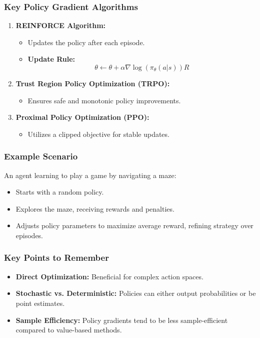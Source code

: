 \documentclass[aspectratio=169]{beamer}
\begin{document}
\begin{frame}[fragile]
    \frametitle{Key Policy Gradient Algorithms}
    \begin{enumerate}
        \item \textbf{REINFORCE Algorithm:}
            \begin{itemize}
                \item Updates the policy after each episode.
                \item \textbf{Update Rule:}
                \begin{equation}
                    \theta \leftarrow \theta + \alpha \nabla \log(\pi_\theta(a|s)) R
                \end{equation}
            \end{itemize}
        \item \textbf{Trust Region Policy Optimization (TRPO):} 
            \begin{itemize}
                \item Ensures safe and monotonic policy improvements.
            \end{itemize}
        \item \textbf{Proximal Policy Optimization (PPO):}
            \begin{itemize}
                \item Utilizes a clipped objective for stable updates.
            \end{itemize}
    \end{enumerate}
\end{frame}

\begin{frame}[fragile]
    \frametitle{Example Scenario}
    An agent learning to play a game by navigating a maze:
    \begin{itemize}
        \item Starts with a random policy.
        \item Explores the maze, receiving rewards and penalties.
        \item Adjusts policy parameters to maximize average reward, refining strategy over episodes.
    \end{itemize}
\end{frame}

\begin{frame}[fragile]
    \frametitle{Key Points to Remember}
    \begin{itemize}
        \item \textbf{Direct Optimization:} Beneficial for complex action spaces.
        \item \textbf{Stochastic vs. Deterministic:} Policies can either output probabilities or be point estimates.
        \item \textbf{Sample Efficiency:} Policy gradients tend to be less sample-efficient compared to value-based methods.
    \end{itemize}
\end{frame}
\end{document}
